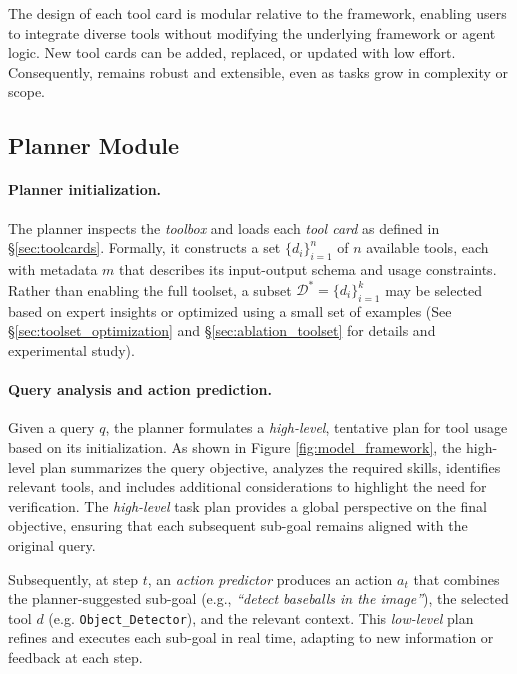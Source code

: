 The design of each tool card is modular relative to the framework, enabling users to integrate diverse tools without modifying the underlying framework or agent logic. New tool cards can be added, replaced, or updated with low effort. Consequently, \model remains robust and extensible, even as tasks grow in complexity or scope.


\subsection{Planner Module}
\label{sec:agent_planning}

\paragraph{Planner initialization.}
The planner inspects the \emph{toolbox} and loads each \emph{tool card} as defined in \S\ref{sec:toolcards}. Formally, it constructs a set $\{d_i\}_{i=1}^n$ of $n$ available tools, each with metadata $m$ that describes its input-output schema and usage constraints. Rather than enabling the full toolset, a subset $\mathcal{D^\text{*}} = \{d_i\}_{i=1}^k$ may be selected based on expert insights or optimized using a small set of examples (See \S\ref{sec:toolset_optimization} and \S\ref{sec:ablation_toolset} for details and experimental study).

\paragraph{Query analysis and action prediction.}
Given a query $q$, the planner formulates a \emph{high-level}, tentative plan for tool usage based on its initialization. As shown in Figure \ref{fig:model_framework}, the high-level plan summarizes the query objective, analyzes the required skills, identifies relevant tools, and includes additional considerations to highlight the need for verification. The \emph{high-level} task plan provides a global perspective on the final objective, ensuring that each subsequent sub-goal remains aligned with the original query.

Subsequently, at step $t$, an \emph{action predictor} produces an action $a_t$ that combines the planner-suggested sub-goal (e.g., \emph{``detect baseballs in the image''}), the selected tool $d$ (e.g. \texttt{Object\_Detector}), and the relevant context. This \emph{low-level} plan refines and executes each sub-goal in real time, adapting to new information or feedback at each step.

